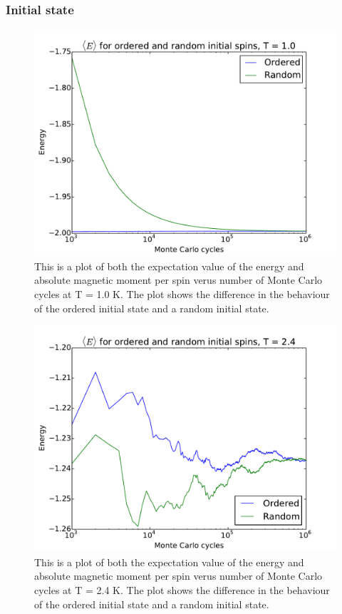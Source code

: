 \subsubsection{Initial state}

\begin{figure}[H]
\includegraphics[width=\linewidth]{../results/4c/ran_order_T1}\caption{This is a plot of both the expectation value of the energy and absolute magnetic moment per spin verus number of Monte Carlo cycles at T = 1.0 K. The plot shows the difference in the behaviour of the ordered initial state and a random initial state.}\label{fig:L_20_initial_T_1.0}
\end{figure}

\begin{figure}[H]
\includegraphics[width=\linewidth]{../results/4c/ran_order_T2}\caption{This is a plot of both the expectation value of the energy and absolute magnetic moment per spin verus number of Monte Carlo cycles at T = 2.4 K. The plot shows the difference in the behaviour of the ordered initial state and a random initial state.}\label{fig:L_20_initial_T_2.4}
\end{figure}

